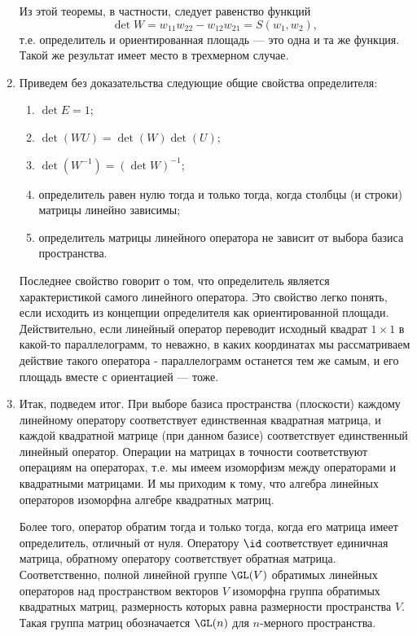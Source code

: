 \begin{enumerate}
Из этой теоремы, в частности, следует равенство функций
$$
\det W = w_{11}w_{22} - w_{12}w_{21} = S(w_1,w_2),
$$
т.е. определитель и ориентированная площадь --- это одна и та же функция. Такой же результат имеет место в трехмерном случае.

\item Приведем без доказательства следующие общие свойства определителя:
\begin{enumerate}[{\bf Det}1]
\item $\det E=1$;
\item $\det(WU)=\det(W)\det(U)$;
\item $\det(W^{-1}) = (\det W)^{-1}$;
\item определитель равен нулю тогда и только тогда, когда столбцы (и строки) матрицы линейно зависимы;
\item определитель матрицы линейного оператора не зависит от выбора базиса пространства.
\end{enumerate}

Последнее свойство говорит о том, что определитель является характеристикой самого линейного оператора. Это свойство легко понять, если исходить из концепции определителя как ориентированной площади. Действительно, если линейный оператор переводит исходный квадрат $1\times 1$ в какой-то параллелограмм, то неважно, в каких координатах мы рассматриваем действие такого оператора - параллелограмм останется тем же самым, и его площадь вместе с ориентацией --- тоже.

\item Итак, подведем итог. При выборе базиса пространства (плоскости) каждому линейному оператору соответствует единственная квадратная матрица, и каждой квадратной матрице (при данном базисе) соответствует единственный линейный оператор. Операции на матрицах в точности соответствуют операциям на операторах, т.е. мы имеем изоморфизм между операторами и квадратными матрицами. 
И мы приходим к тому, что алгебра линейных операторов изоморфна алгебре квадратных матриц.

Более того, оператор обратим тогда и только тогда, когда его матрица имеет определитель, отличный от нуля. Оператору $\id$ соответствует единичная матрица, обратному оператору соответствует обратная матрица. Соответственно, полной линейной группе $\GL(V)$ обратимых линейных операторов над пространством векторов $V$ изоморфна группа обратимых квадратных матриц, размерность которых равна размерности пространства $V$. Такая группа матриц обозначается $\GL(n)$ для $n$-мерного пространства.
\end{enumerate}


